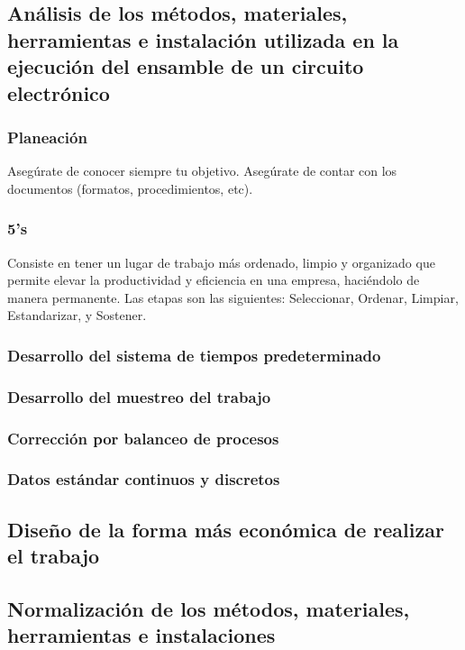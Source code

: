     \subsection{Análisis de los métodos, materiales, herramientas e instalación utilizada en la ejecución del ensamble de un circuito electrónico}
    
    \subsubsection{Planeación}
    
    Asegúrate de conocer siempre tu objetivo.
    Asegúrate de contar con los documentos (formatos, procedimientos, etc).
    \subsubsection{5's}
    
    Consiste en tener un lugar de trabajo
    más ordenado, limpio y organizado que
    permite elevar la productividad y
    eficiencia en una empresa, haciéndolo de manera permanente.
    Las etapas son las siguientes: Seleccionar, Ordenar, Limpiar, Estandarizar, y Sostener.
    \subsubsection{Desarrollo del sistema de tiempos predeterminado}
    \subsubsection{Desarrollo del muestreo del trabajo}
    \subsubsection{Corrección por balanceo de procesos}
    \subsubsection{Datos estándar continuos y discretos}
    \subsection{Diseño de la forma más económica de realizar el trabajo}
    \subsection{Normalización de los métodos, materiales, herramientas e instalaciones}

